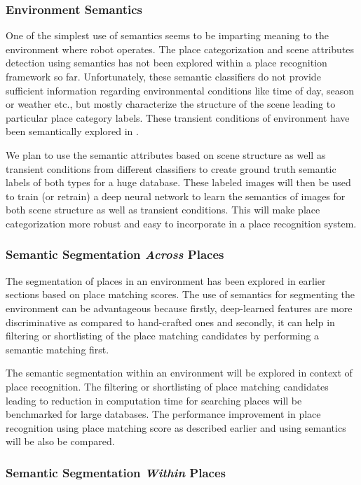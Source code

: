 \documentclass{article}
\begin{document}
\subsubsection{Environment Semantics}
One of the simplest use of semantics seems to be imparting meaning to the environment where robot operates. The place categorization \cite{zhou2014learning} and scene attributes detection \cite{Patterson2012SunAttributes} using semantics has not been explored within a place recognition framework so far. Unfortunately, these semantic classifiers do not provide sufficient information regarding environmental conditions like time of day, season or weather etc., but mostly characterize the structure of the scene leading to particular place category labels. These transient conditions of environment have been semantically explored in \cite{laffont2014transient}. 

We plan to use the semantic attributes based on scene structure as well as transient conditions from different classifiers to create ground truth semantic labels of both types for a huge database. These labeled images will then be used to train (or retrain) a deep neural network to learn the semantics of images for both scene structure as well as transient conditions. This will make place categorization more robust and easy to incorporate in a place recognition system.

\subsubsection{Semantic Segmentation \emph{Across} Places}
The segmentation of places in an environment has been explored in earlier sections based on place matching scores. The use of semantics for segmenting the environment can be advantageous because firstly, deep-learned features are more discriminative as compared to hand-crafted ones and secondly, it can help in filtering or shortlisting of the place matching candidates by performing a semantic matching first.

The semantic segmentation within an environment will be explored in context of place recognition. The filtering or shortlisting of place matching candidates leading to reduction in computation time for searching places will be benchmarked for large databases. The performance improvement in place recognition using place matching score as described earlier and using semantics will be also be compared.

\subsubsection{Semantic Segmentation \emph{Within} Places}
\end{document}
